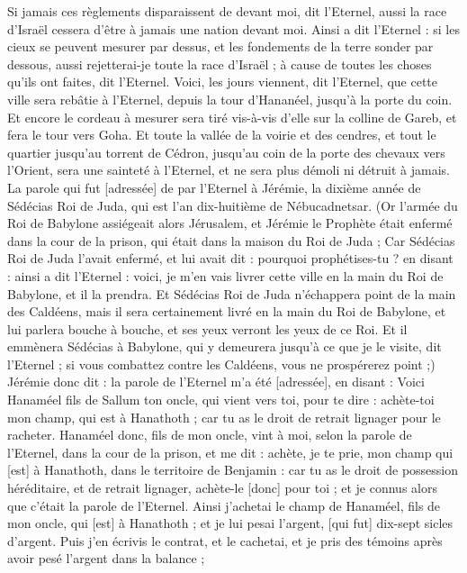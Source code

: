 \begin{multicols}{2}
Si jamais ces règlements disparaissent de devant moi, dit l'Eternel, aussi la race d'Israël cessera d'être à jamais une nation devant moi.
Ainsi a dit l'Eternel : si les cieux se peuvent mesurer par dessus, et les fondements de la terre sonder par dessous, aussi rejetterai-je toute la race d'Israël ; à cause de toutes les choses qu'ils ont faites, dit l'Eternel.
Voici, les jours viennent, dit l'Eternel, que cette ville sera rebâtie à l'Eternel, depuis la tour d'Hananéel, jusqu'à la porte du coin.
Et encore le cordeau à mesurer sera tiré vis-à-vis d'elle sur la colline de Gareb, et fera le tour vers Goha.
Et toute la vallée de la voirie et des cendres, et tout le quartier jusqu’au torrent de Cédron, jusqu’au coin de la porte des chevaux vers l'Orient, sera une sainteté à l'Eternel, et ne sera plus démoli ni détruit à jamais.
\VerseOne{}La parole qui fut [adressée] de par l'Eternel à Jérémie, la dixième année de Sédécias Roi de Juda, qui est l'an dix-huitième de Nébucadnetsar.
(Or l'armée du Roi de Babylone assiégeait alors Jérusalem, et Jérémie le Prophète était enfermé dans la cour de la prison, qui était dans la maison du Roi de Juda ;
Car Sédécias Roi de Juda l'avait enfermé, et lui avait dit : pourquoi prophétises-tu ? en disant : ainsi a dit l'Eternel : voici, je m'en vais livrer cette ville en la main du Roi de Babylone, et il la prendra.
Et Sédécias Roi de Juda n'échappera point de la main des Caldéens, mais il sera certainement livré en la main du Roi de Babylone, et lui parlera bouche à bouche, et ses yeux verront les yeux de ce Roi.
Et il emmènera Sédécias à Babylone, qui y demeurera jusqu’à ce que je le visite, dit l'Eternel ; si vous combattez contre les Caldéens, vous ne prospérerez point ;)
Jérémie donc dit : la parole de l'Eternel m'a été [adressée], en disant :
Voici Hanaméel fils de Sallum ton oncle, qui vient vers toi, pour te dire : achète-toi mon champ, qui est à Hanathoth ; car tu as le droit de retrait lignager pour le racheter.
Hanaméel donc, fils de mon oncle, vint à moi, selon la parole de l'Eternel, dans la cour de la prison, et me dit : achète, je te prie, mon champ qui [est] à Hanathoth, dans le territoire de Benjamin : car tu as le droit de possession héréditaire, et de retrait lignager, achète-le [donc] pour toi ; et je connus alors que c'était la parole de l'Eternel.
Ainsi j'achetai le champ de Hanaméel, fils de mon oncle, qui [est] à Hanathoth ; et je lui pesai l'argent, [qui fut] dix-sept sicles d'argent.
Puis j'en écrivis le contrat, et le cachetai, et je pris des témoins après avoir pesé l'argent dans la balance ;

\end{multicols}
